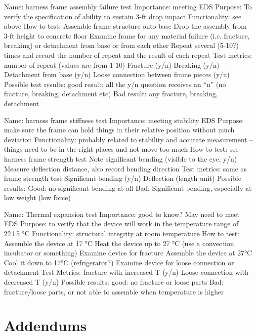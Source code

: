 \documentclass{article}
\begin{document}
Name: harness frame assembly failure test 
Importance: meeting EDS
Purpose: To verify the specification of ability to sustain 3-ft drop impact
Functionality: see above
How to test: Assemble frame structure onto base
          Drop the assembly from 3-ft height to concrete floor
          Examine frame for any material failure (i.e. fracture, breaking) or detachment from base or from each other
           Repeat several (5-10?) times and record the number of repeat and the result of each repeat
Test metrics: number of repeat (values are from 1-10)
                   Fracture (y/n)
                   Breaking (y/n)
                   Detachment from base (y/n)
                   Loose connection between frame pieces (y/n) 
Possible test results: good result: all the y/n question receives an “n” (no fracture, breaking, detachment etc)
                 Bad result: any fracture, breaking, detachment 

Name: harness frame stiffness test
Importance: meeting stability EDS
Purpose: make sure the frame can hold things in their relative position without much deviation
Functionality: probably related to stability and accurate measurement – things need to be in the right places and not move too much
How to test: see harness frame strength test
           Note significant bending (visible to the eye, y/n)
           Measure deflection distance, also record bending direction
Test metrics: same as frame strength test
Significant bending (y/n)
           Deflection (length unit)
Possible results: Good: no significant bending at all
              Bad: Significant bending, especially at low weight (low force)

Name: Thermal expansion test
Importance: good to know? May need to meet EDS 
Purpose: to verify that the device will work in the temperature range of 22±5 °C
Functionality: structural integrity at room temperature
How to test: Assemble the device at 17 °C
          Heat the device up to 27 °C (use a convection incubator or something)
          Examine device for fracture  
          Assemble the device at 27°C
          Cool it down to 17°C (refrigerator?)
          Examine device for loose connection or detachment
Test Metrics: fracture with increased T (y/n)
           Loose connection with decreased T (y/n)
Possible results: good: no fracture or loose parts
              Bad: fracture/loose parts, or not able to assemble when temperature is higher

\section{Addendums}
\label{sec:addendums}

\newpage
{}


\end{document}

